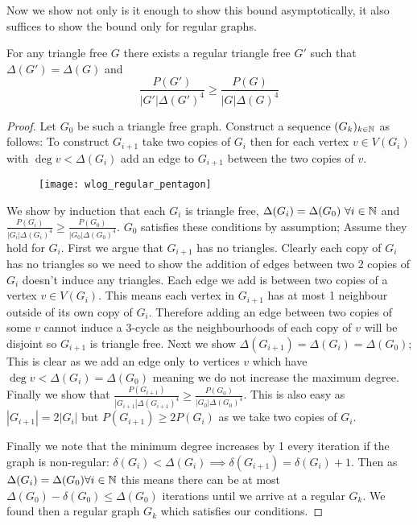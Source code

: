 Now we show not only is it enough to show this bound asymptotically, it also suffices
to show the bound only for regular graphs.

\begin{lemma}
    For any triangle free $G$ there exists a regular triangle free $G'$ such that
    $\Delta(G')=\Delta(G)$ and
    \[
        \frac{P(G')}{|G'|\Delta(G')^4} \geq
        \frac{P(G)}{|G|\Delta(G)^4}
    \]
\end{lemma}

\begin{proof}
    Let $G_0$ be such a triangle free graph. Construct a sequence $(G_k)_{k\in\mathbb{N}}$ as
    follows: To construct $G_{i+1}$ take two copies of $G_i$ then for each vertex $v\in V(G_i)$
    with $\deg v < \Delta(G_i)$ add an edge to $G_{i+1}$ between the two copies of $v$.

    \begin{figure}[!ht]
        \centering
        \texttt{[image: wlog\_regular\_pentagon]}
    \end{figure}

    We show by induction that each $G_i$ is triangle free, $\Delta(G_i)=\Delta(G_0)\ \forall i\in\N$
    and $\frac{P(G_i)}{|G_i|\Delta(G_i)^4} \geq \frac{P(G_0)}{|G_0|\Delta(G_0)^4}$.
    $G_0$ satisfies these conditions
    by assumption; Assume they hold for $G_i$. First we argue that $G_{i+1}$ has no
    triangles. Clearly each copy of $G_i$ has no triangles so we need to show the
    addition of edges between two 2 copies of $G_i$ doesn't induce any triangles.
    Each edge we add is between two copies of a vertex $v\in V(G_i)$. This means
    each vertex in $G_{i+1}$ has at most 1 neighbour outside of its own copy of $G_i$.
    Therefore adding an edge between two copies of some $v$ cannot induce a 3-cycle
    as the neighbourhoods of each copy of $v$ will be disjoint so $G_{i+1}$ is
    triangle free. Next we show $\Delta(G_{i+1})=\Delta(G_i)=\Delta(G_0)$; This is
    clear as we add an edge only to vertices $v$ which have $\deg v < \Delta(G_i)=\Delta(G_0)$
    meaning we do not increase the maximum degree.
    Finally we show that
    $\frac{P(G_{i+1})}{|G_{i+1}|\Delta(G_{i+1})^4} \geq \frac{P(G_0)}{|G_0|\Delta(G_0)^4}$.
    This is also easy as $|G_{i+1}|=2|G_i|$ but $P(G_{i+1}) \geq 2 P(G_i)$ as we take
    two copies of $G_i$.

    Finally we note that the minimum degree increases by 1 every iteration if the
    graph is non-regular: $\delta(G_i) < \Delta(G_i) \implies \delta(G_{i+1})=\delta(G_i) + 1$.
    Then as $\Delta(G_i)=\Delta(G_0)\forall i\in\mathbb{N}$ this means there can be at most
    $\Delta(G_0)-\delta(G_0) \leq \Delta(G_0)$ iterations until we arrive at a regular
    $G_k$. We found then a regular graph $G_k$ which satisfies our conditions.
\end{proof}

